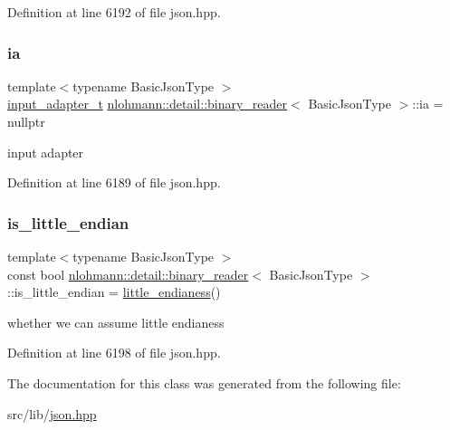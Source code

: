 Definition at line 6192 of file json.\+hpp.

\mbox{\label{classnlohmann_1_1detail_1_1binary__reader_adae482b45b2bb733cad3efce034a8b71}} 
\subsubsection{\texorpdfstring{ia}{ia}}
{\footnotesize\ttfamily template$<$typename Basic\+Json\+Type $>$ \\
\hyperlink{namespacenlohmann_1_1detail_ae132f8cd5bb24c5e9b40ad0eafedf1c2}{input\+\_\+adapter\+\_\+t} \hyperlink{classnlohmann_1_1detail_1_1binary__reader}{nlohmann\+::detail\+::binary\+\_\+reader}$<$ Basic\+Json\+Type $>$\+::ia = nullptr\hspace{0.3cm}{\ttfamily [private]}}



input adapter 



Definition at line 6189 of file json.\+hpp.

\mbox{\label{classnlohmann_1_1detail_1_1binary__reader_a54c18bdb48cccf35a8f941640e0fcea4}} 
\subsubsection{\texorpdfstring{is\+\_\+little\+\_\+endian}{is\_little\_endian}}
{\footnotesize\ttfamily template$<$typename Basic\+Json\+Type $>$ \\
const bool \hyperlink{classnlohmann_1_1detail_1_1binary__reader}{nlohmann\+::detail\+::binary\+\_\+reader}$<$ Basic\+Json\+Type $>$\+::is\+\_\+little\+\_\+endian = \hyperlink{classnlohmann_1_1detail_1_1binary__reader_a1d8f70f95d241354f86a0b9ae711c1c3}{little\+\_\+endianess}()\hspace{0.3cm}{\ttfamily [private]}}



whether we can assume little endianess 



Definition at line 6198 of file json.\+hpp.



The documentation for this class was generated from the following file\+:\begin{DoxyCompactItemize}
\item 
src/lib/\hyperlink{json_8hpp}{json.\+hpp}\end{DoxyCompactItemize}
